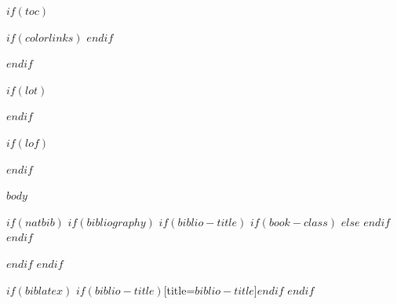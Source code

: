 \documentclass[10pt, letterpaper, titlepage, oneside, openright, final, article]{memoir}
\begin{document}
\cleardoublepage

%
%

%
%
$if(toc)$
{
    $if(colorlinks)$
        \hypersetup{linkcolor=$if(toccolor)$$toccolor$$else$$endif$}
    $endif$
    \cleardoublepage
    \begin{KeepFromToc} %
        \tableofcontents
    \end{KeepFromToc}
    \pagebreak
    \cleardoublepage
}
$endif$

$if(lot)$
    \listoftables
$endif$

$if(lof)$
    \listoffigures
$endif$


\mainmatter
$body$

\appendix

\backmatter

$if(natbib)$
    $if(bibliography)$
        $if(biblio-title)$
            $if(book-class)$
                \renewcommand\bibname{$biblio-title$}
            $else$
                \renewcommand\refname{$biblio-title$}
            $endif$
        $endif$
        
    $endif$
$endif$

$if(biblatex)$
    \printbibliography$if(biblio-title)$[title=$biblio-title$]$endif$
$endif$


\end{document}
